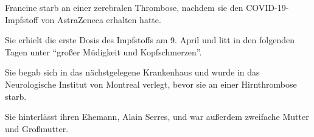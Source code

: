 Francine starb an einer zerebralen Thrombose, nachdem sie den COVID-19-Impfstoff
von AstraZeneca erhalten hatte.

Sie erhielt die erste Dosis des Impfstoffs am 9. April und litt in den folgenden
Tagen unter ``großer Müdigkeit und Kopfschmerzen''.

Sie begab sich in das nächstgelegene Krankenhaus und wurde in das Neurologische
Institut von Montreal verlegt, bevor sie an einer Hirnthrombose starb.

Sie hinterlässt ihren Ehemann, Alain Serres, und war außerdem zweifache Mutter
und Großmutter.
